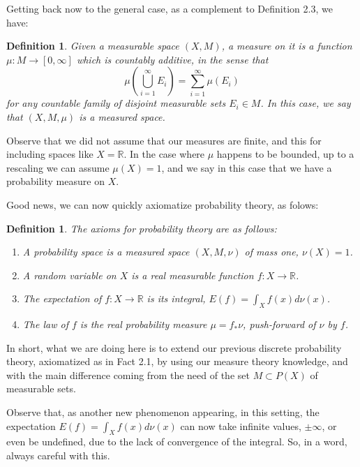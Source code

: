 \documentclass[12pt]{amsbook}
\newtheorem{definition}[theorem]{Definition}
\begin{document}
Getting back now to the general case, as a complement to Definition 2.3, we have:

\begin{definition}
Given a measurable space $(X,M)$, a measure on it is a function $\mu:M\to[0,\infty]$ which is countably additive, in the sense that
$$\mu\left(\bigcup_{i=1}^\infty E_i\right)=\sum_{i=1}^\infty\mu(E_i)$$
for any countable family of disjoint measurable sets $E_i\in M$. In this case, we say that $(X,M,\mu)$ is a measured space.
\end{definition}

Observe that we did not assume that our measures are finite, and this for including spaces like $X=\mathbb R$. In the case where $\mu$ happens to be bounded, up to a rescaling we can assume $\mu(X)=1$, and we say in this case that we have a probability measure on $X$.

\bigskip

Good news, we can now quickly axiomatize probability theory, as folows:

\begin{definition}
The axioms for probability theory are as follows:
\begin{enumerate}
\item A probability space is a measured space $(X,M,\nu)$ of mass one, $\nu(X)=1$.

\item A random variable on $X$ is a real measurable function $f:X\to\mathbb R$.

\item The expectation of $f:X\to\mathbb R$ is its integral, $E(f)=\int_Xf(x)d\nu(x)$.

\item The law of $f$ is the real probability measure $\mu=f_*\nu$, push-forward of $\nu$ by $f$.
\end{enumerate}
\end{definition}

In short, what we are doing here is to extend our previous discrete probability theory, axiomatized as in Fact 2.1, by using our measure theory knowledge, and with the main difference coming from the need of the set $M\subset P(X)$ of measurable sets.

\bigskip

Observe that, as another new phenomenon appearing, in this setting, the expectation $E(f)=\int_Xf(x)d\nu(x)$ can now take infinite values, $\pm\infty$, or even be undefined, due to the lack of convergence of the integral. So, in a word, always careful with this.
\end{document}
